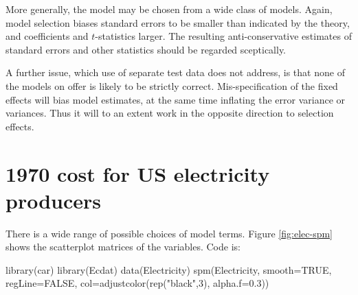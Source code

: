 More generally, 
the model may be chosen from a wide class of models.
Again, model selection biases standard errors to be smaller than
indicated by the theory, and coefficients and $t$-statistics larger.
The resulting anti-conservative estimates of standard errors and
other statistics should be regarded
sceptically. 

A further issue, which use of separate test data does not
  address, is that none of the models on offer is likely to be
  strictly correct. Mis-specification of the fixed effects will bias
  model estimates, at the same time inflating the error variance or
  variances.  Thus it will to an extent work in the opposite direction
  to selection effects.

\section{1970 cost for US electricity producers}\label{ss:elec}

There is a wide range of possible choices of model terms.
Figure \ref{fig:elec-spm} shows the scatterplot matrices of the
variables. Code is:
\begin{Schunk}
\begin{Sinput}
library(car)
library(Ecdat)
data(Electricity)
spm(Electricity, smooth=TRUE, regLine=FALSE,
    col=adjustcolor(rep("black",3), alpha.f=0.3))
\end{Sinput}
\end{Schunk}

